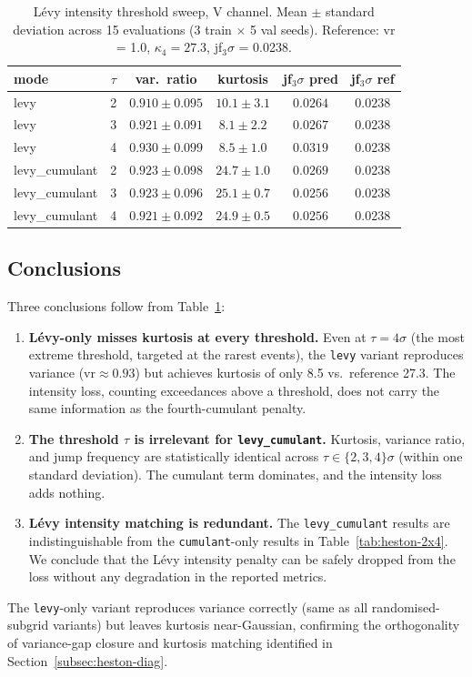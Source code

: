 \documentclass[review,12pt]{elsarticle}
\begin{document}
\begin{table}[h]
\centering
\caption{L\'evy intensity threshold sweep, V channel. Mean
$\pm$ standard deviation across 15 evaluations (3 train
$\times$ 5 val seeds). Reference: vr = 1.0,
$\kappa_4 = 27.3$, jf\(_3\sigma\) = 0.0238.}
\label{tab:levy-tau}
\begin{tabular}{l c c c c c}
\toprule
mode & $\tau$ & var.\ ratio & kurtosis & jf\(_3\sigma\) pred & jf\(_3\sigma\) ref \\
\midrule
levy & 2 & $0.910 \pm 0.095$ & $10.1 \pm 3.1$ & $0.0264$ & $0.0238$ \\
levy & 3 & $0.921 \pm 0.091$ & $8.1 \pm 2.2$ & $0.0267$ & $0.0238$ \\
levy & 4 & $0.930 \pm 0.099$ & $8.5 \pm 1.0$ & $0.0319$ & $0.0238$ \\
\midrule
levy\_cumulant & 2 & $0.923 \pm 0.098$ & $24.7 \pm 1.0$ & $0.0269$ & $0.0238$ \\
levy\_cumulant & 3 & $0.923 \pm 0.096$ & $25.1 \pm 0.7$ & $0.0256$ & $0.0238$ \\
levy\_cumulant & 4 & $0.921 \pm 0.092$ & $24.9 \pm 0.5$ & $0.0256$ & $0.0238$ \\
\bottomrule
\end{tabular}
\end{table}

\subsection{Conclusions}

Three conclusions follow from Table~\ref{tab:levy-tau}:

\begin{enumerate}
\item \textbf{L\'evy-only misses kurtosis at every threshold.}
Even at $\tau = 4\sigma$ (the most extreme threshold, targeted
at the rarest events), the \texttt{levy} variant reproduces
variance (\(\mathrm{vr} \approx 0.93\)) but achieves kurtosis
of only 8.5 vs.\ reference 27.3. The intensity loss, counting
exceedances above a threshold, does not carry the same information
as the fourth-cumulant penalty.

\item \textbf{The threshold $\tau$ is irrelevant for
\texttt{levy\_cumulant}.} Kurtosis, variance ratio, and jump
frequency are statistically identical across $\tau \in
\{2, 3, 4\}\sigma$ (within one standard deviation). The
cumulant term dominates, and the intensity loss adds nothing.

\item \textbf{L\'evy intensity matching is redundant.} The
\texttt{levy\_cumulant} results are indistinguishable from the
\texttt{cumulant}-only results in Table~\ref{tab:heston-2x4}.
We conclude that the L\'evy intensity penalty can be safely
dropped from the loss without any degradation in the reported
metrics.
\end{enumerate}

The \texttt{levy}-only variant reproduces variance correctly
(same as all randomised-subgrid variants) but leaves kurtosis
near-Gaussian, confirming the orthogonality of variance-gap
closure and kurtosis matching identified in
Section~\ref{subsec:heston-diag}.
\end{document}
